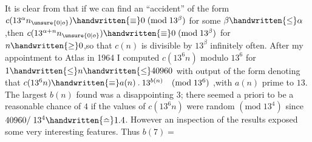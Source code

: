 It is clear from  that if we can find an ``accident'' of the form $c(13^{\alpha}n_{\unsure{0|o}})\handwritten{\equiv}0\;(\mathrm{mod}\;13^{\beta})$ for some $\beta\handwritten{\leq}\alpha$,then $c(13^{\alpha+n}n_{\unsure{0|o}})\handwritten{\equiv}0\;(\mathrm{mod}\;13^{\beta})$ for $n\handwritten{\geq}0$,so that \uline{$c(n)$} is divisible by $13^{\beta}$ infinitely often. After my appointment to Atlas in 1964 I computed \uline{$c(13^{6}n)$} modulo $13^{6}$ for $1\handwritten{\leq}n\handwritten{\leq}40960$ with output of the form
denoting that $c(13^{6}n)\handwritten{\equiv}a(n)\mathbin{.}13^{b(n)}\quad(\mathrm{mod}\;13^{6})$ ,with \uline{$a(n)$} prime to $13$. The largest $b(n)$ found was a disappointing $3$; there seemed a priori to be a reasonable chance of $4$ if the values of \uline{$c(13^{6}n)$} were random $(\mathrm{mod}\;13^{4})$ since $40960/\;13^{4}\handwritten{\bumpeq}1.4$. However an inspection of the results exposed some very interesting features. Thus $b(7)=$\ \parbox[c]{12mm}{}

